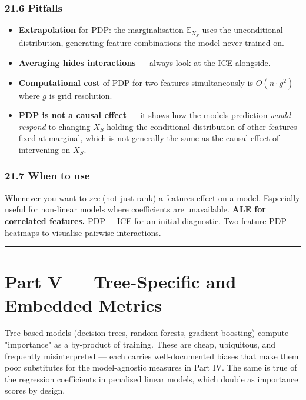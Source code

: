 \documentclass{article}
\providecommand{\tightlist}{\setlength{\itemsep}{0pt}\setlength{\parskip}{0pt}}
\let\oldsection\section
\renewcommand{\section}{\clearpage\oldsection}
\begin{document}
\subsubsection{21.6 Pitfalls}\label{216-pitfalls}

\begin{itemize}
\tightlist
\item
  \textbf{Extrapolation} for PDP: the marginalisation
  \(\mathbb{E}_{X_{\bar{S}}}\) uses the unconditional distribution,
  generating feature combinations the model never trained on.
\item
  \textbf{Averaging hides interactions} --- always look at the ICE
  alongside.
\item
  \textbf{Computational cost} of PDP for two features simultaneously is
  \(O(n \cdot g^2)\) where \(g\) is grid resolution.
\item
  \textbf{PDP is not a causal effect} --- it shows how the
  model\textquotesingle s prediction \emph{would respond} to changing
  \(X_S\) holding the conditional distribution of other features
  fixed-at-marginal, which is not generally the same as the causal
  effect of intervening on \(X_S\).
\end{itemize}

\subsubsection{21.7 When to use}\label{217-when-to-use}

Whenever you want to \emph{see} (not just rank) a
feature\textquotesingle s effect on a model. Especially useful for
non-linear models where coefficients are unavailable. \textbf{ALE for
correlated features.} PDP + ICE for an initial diagnostic. Two-feature
PDP heatmaps to visualise pairwise interactions.

\begin{center}\rule{0.5\linewidth}{0.5pt}\end{center}

\section{Part V --- Tree-Specific and Embedded
Metrics}\label{part-v--tree-specific-and-embedded-metrics}

Tree-based models (decision trees, random forests, gradient boosting)
compute "importance" as a by-product of training. These are cheap,
ubiquitous, and frequently misinterpreted --- each carries
well-documented biases that make them poor substitutes for the
model-agnostic measures in Part IV. The same is true of the regression
coefficients in penalised linear models, which double as importance
scores by design.
\end{document}
